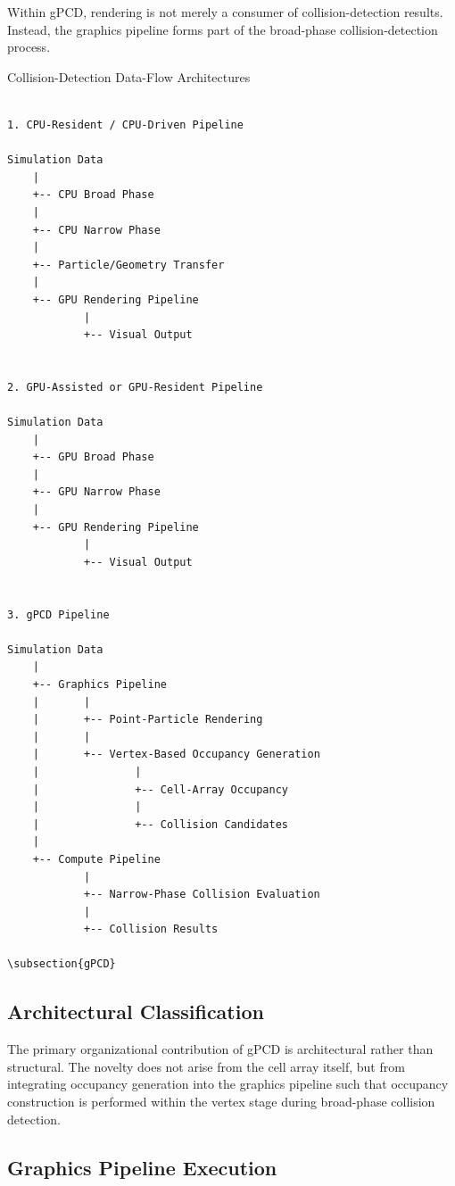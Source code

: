 Within gPCD, rendering is not merely a consumer of collision-detection
results. Instead, the graphics pipeline forms part of the broad-phase
collision-detection process.

Collision-Detection Data-Flow Architectures
\lstset{
  language=TeX,
  basicstyle=\ttfamily,
}

\begin{lstlisting}

1. CPU-Resident / CPU-Driven Pipeline

Simulation Data
    |
    +-- CPU Broad Phase
    |
    +-- CPU Narrow Phase
    |
    +-- Particle/Geometry Transfer
    |
    +-- GPU Rendering Pipeline
            |
            +-- Visual Output


2. GPU-Assisted or GPU-Resident Pipeline

Simulation Data
    |
    +-- GPU Broad Phase
    |
    +-- GPU Narrow Phase
    |
    +-- GPU Rendering Pipeline
            |
            +-- Visual Output


3. gPCD Pipeline

Simulation Data
    |
    +-- Graphics Pipeline
    |       |
    |       +-- Point-Particle Rendering
    |       |
    |       +-- Vertex-Based Occupancy Generation
    |               |
    |               +-- Cell-Array Occupancy
    |               |
    |               +-- Collision Candidates
    |
    +-- Compute Pipeline
            |
            +-- Narrow-Phase Collision Evaluation
            |
            +-- Collision Results

\subsection{gPCD}
\end{lstlisting}


\subsection{Architectural Classification}

The primary organizational contribution of gPCD is architectural rather
than structural. The novelty does not arise from the cell array itself, but from
integrating occupancy generation into the graphics pipeline such that
occupancy construction is performed within the vertex stage during
broad-phase collision detection.



\subsection{Graphics Pipeline Execution}

